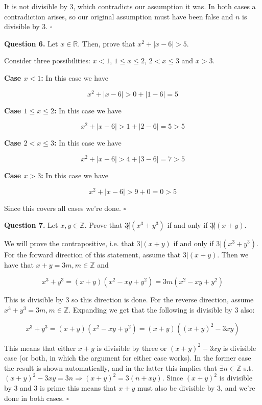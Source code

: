 \documentclass[letterpaper, reqno,11pt]{article}
\newcommand{\RR}{\mathbb{R}}
\newcommand{\ZZ}{\mathbb{Z}}
\begin{document}
It is not divisible by $3$, which contradicts our assumption it was. In both cases a contradiction arises, so our original assumption must have been false and $n$ is divisible by 3. $\square$

{\noindent\bf Question 6.} Let $x\in\RR$. Then, prove that $x^2+|x-6|>5$. 

\medskip

Consider three possibilities: $x<1$, $1\leq x\leq 2$, $2< x\leq3$ and $x>3$. 

{\bf Case $x<1$:} In this case we have 

$$
    x^2+|x-6|>0+|1-6|=5
$$

{\bf Case $1\leq x\leq 2$:} In this case we have

$$
    x^2+|x-6|>1+|2-6|=5>5
$$

{\bf Case $2<x\leq 3$:} In this case we have

$$
    x^2+|x-6|>4+|3-6|=7>5
$$

{\bf Case $x>3$:} In this case we have 

$$
    x^2+|x-6|>9+0=0>5
$$

Since this covers all cases we're done. $\square$

{\noindent\bf Question 7.} Let $x, y\in\ZZ$. Prove that $3\not|(x^3+y^3)$ if and only if $3\not|(x+y)$. 

We will prove the contrapositive, i.e. that $3|(x+y)$ if and only if $3|(x^3+y^3)$. For the forward direction of this statement, assume that $3|(x+y)$. Then we have that $x+y=3m, m\in\ZZ$ and 

$$
    x^3+y^3=(x+y)(x^2-xy+y^2)=3m(x^2-xy+y^2)
$$

This is divisible by $3$ so this direction is done. For the reverse direction, assume $x^3+y^3=3m, m\in\ZZ$. Expanding we get that the following is divisible by 3 also: 

$$
    x^3+y^3=(x+y)(x^2-xy+y^2)=(x+y)((x+y)^2-3xy)
$$

This means that either $x+y$ is divisible by three or $(x+y)^2-3xy$ is divisible case (or both, in which the argument for either case works). In the former case the result is shown automatically, and in the latter this implies that $\exists n\in\ZZ$ s.t. $(x+y)^2-3xy=3n\Rightarrow (x+y)^2=3(n+xy)$. Since $(x+y)^2$ is divisible by 3 and 3 is prime this means that $x+y$ must also be divisible by 3, and we're done in both cases. $\square$
\end{document}
